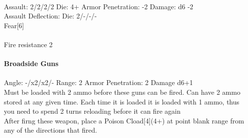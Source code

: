 \ \\
Assault: 2/2/2/2 Die: 4+ Armor Penetration: -2 Damage: d6 -2 \\
Assault Deflection:  Die: 2/-/-/-\\
\indent Fear[6] \\
\ \\
Fire resistance 2
\ \\
\ \\
{\bf Broadside Guns } \\
\ \\
Angle: -/x2/x2/- Range: 2 Armor Penetration: 2 Damage d6+1 \\
\indent Must be loaded with 2 ammo before these guns can be fired. Can have 2 ammo stored at any given time. Each time it is loaded it is loaded with 1 ammo, thus you need to spend 2 turns reloading before it can fire again\\ After firng these weapon, place a Poison Cload[4](4+) at point blank range from any of the directions that fired. \\





